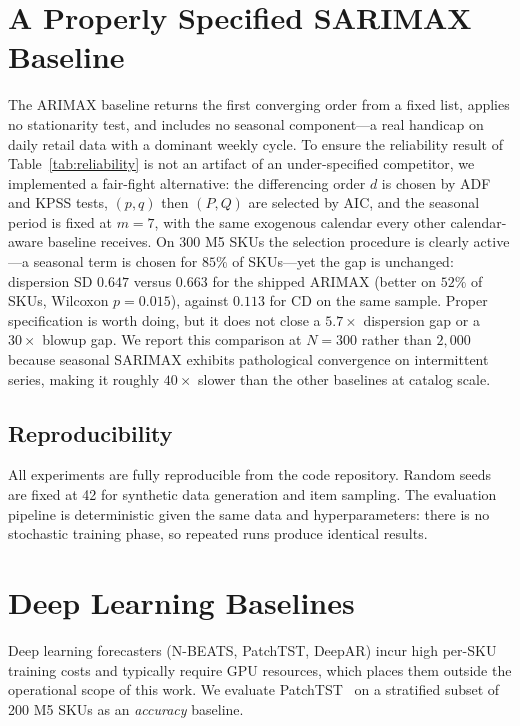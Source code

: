 \documentclass[10pt]{article} %
\theoremstyle{plain}
\theoremstyle{definition}
\begin{document}
\section{A Properly Specified SARIMAX Baseline}
\label{app:sarimax}

The ARIMAX baseline returns the first converging order from a fixed list, applies no stationarity
test, and includes no seasonal component---a real handicap on daily retail data with a dominant
weekly cycle. To ensure the reliability result of Table~\ref{tab:reliability} is not an artifact
of an under-specified competitor, we implemented a fair-fight alternative: the differencing order
$d$ is chosen by ADF and KPSS tests, $(p,q)$ then $(P,Q)$ are selected by AIC, and the seasonal
period is fixed at $m=7$, with the same exogenous calendar every other calendar-aware baseline
receives. On 300 M5 SKUs the selection procedure is clearly active---a seasonal term is chosen
for $85\%$ of SKUs---yet the gap is unchanged: dispersion SD $0.647$ versus $0.663$ for the
shipped ARIMAX (better on $52\%$ of SKUs, Wilcoxon $p=0.015$), against $0.113$ for CD on the same
sample. Proper specification is worth doing, but it does not close a $5.7\times$ dispersion gap
or a $30\times$ blowup gap. We report this comparison at $N=300$ rather than $2{,}000$ because
seasonal SARIMAX exhibits pathological convergence on intermittent series, making it roughly
$40\times$ slower than the other baselines at catalog scale.

\subsection{Reproducibility}
\label{app:reproducibility}

All experiments are fully reproducible from the code repository. Random seeds are fixed at 42 for synthetic data generation and item sampling. The evaluation pipeline is deterministic given the same data and hyperparameters: there is no stochastic training phase, so repeated runs produce identical results.


\section{Deep Learning Baselines}
\label{app:dl_baselines}

Deep learning forecasters (N-BEATS, PatchTST, DeepAR) incur high per-SKU training costs and typically require GPU resources, which places them outside the operational scope of this work. We evaluate PatchTST~\citep{nie2022patchtst} on a stratified subset of 200 M5 SKUs as an \emph{accuracy} baseline.
\end{document}
